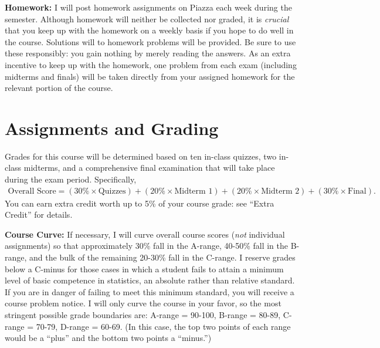 \documentclass[11pt, letterpaper]{article}
\begin{document}
\medskip

\noindent \textbf{Homework:} 
I will post homework assignments on Piazza each week during the semester.
Although homework will neither be collected nor graded, it is \emph{crucial} that you keep up with the homework on a weekly basis if you hope to do well in the course.
Solutions will to homework problems will be provided.
Be sure to use these responsibly: you gain nothing by merely reading the answers. 
As an extra incentive to keep up with the homework, one problem from each  exam (including midterms and finals) will be taken directly from your assigned homework for the relevant portion of the course.



\section*{Assignments and Grading}

Grades for this course will be determined based on ten in-class quizzes, two in-class midterms, and a comprehensive final examination that will take place during the exam period.
Specifically,
	\begin{equation*}
	\begin{split}
		\mbox{Overall Score} = (30\% \times \mbox{Quizzes})  + (20\% \times \mbox{Midterm 1}) + (20\% \times \mbox{Midterm 2}) + (30\% \times \mbox{Final}).
	\end{split}
	\end{equation*}
You can earn extra credit worth up to 5\% of your course grade: see ``Extra Credit'' for details.

\medskip 

\noindent \textbf{Course Curve:}
If necessary, I will curve overall course scores (\emph{not} individual assignments) so that approximately 30\% fall in the A-range, 40-50\% fall in the B-range, and the bulk of the remaining 20-30\% fall in the C-range. 
I reserve grades below a C-minus for those cases in which a student fails to attain a minimum level of basic competence in statistics, an absolute rather than relative standard. 
If you are in danger of failing to meet this minimum standard, you will receive a course problem notice.
I will only curve the course in your favor, so the most stringent possible grade boundaries are: A-range = 90-100, B-range = 80-89, C-range = 70-79, D-range = 60-69.
(In this case, the top two points of each range would be a ``plus'' and the bottom two points a ``minus.'')

\medskip
\end{document}
